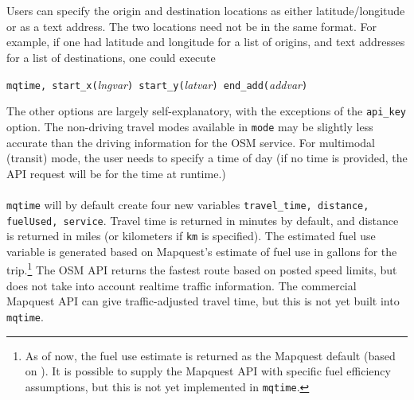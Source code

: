\documentclass[11pt]{article}
\begin{document}
\\ \\
Users can specify the origin and destination locations as either latitude/longitude or as a text address. The two locations need not be in the same format. For example, if one had latitude and longitude for a list of origins, and text addresses for a list of destinations, one could execute
\begin{center}
\verb|mqtime, start_x(|\textit{lngvar}\verb|) start_y(|\textit{latvar}\verb|) end_add(|\textit{addvar}\verb|)|
\end{center}
The other options are largely self-explanatory, with the exceptions of the \verb|api_key| option. The non-driving travel modes available in \verb|mode| may be slightly less accurate than the driving information for the OSM service. For multimodal (transit) mode, the user needs to specify a time of day (if no time is provided, the API request will be for the time at runtime.)
\\ \\
\verb|mqtime| will by default create four new variables \verb|travel_time, distance, fuelUsed, service|. Travel time is returned in minutes by default, and distance is returned in miles (or kilometers if \verb|km| is specified). The estimated fuel use variable is generated based on Mapquest's estimate of fuel use in gallons for the trip.\footnote{As of now, the fuel use estimate is returned as the Mapquest default (based on ). It is possible to supply the Mapquest API with specific fuel efficiency assumptions, but this is not yet implemented in \texttt{mqtime}.} The OSM API returns the fastest route based on posted speed limits, but does not take into account realtime traffic information. The commercial Mapquest API can give traffic-adjusted travel time, but this is not yet built into \verb|mqtime|.
\end{document}
